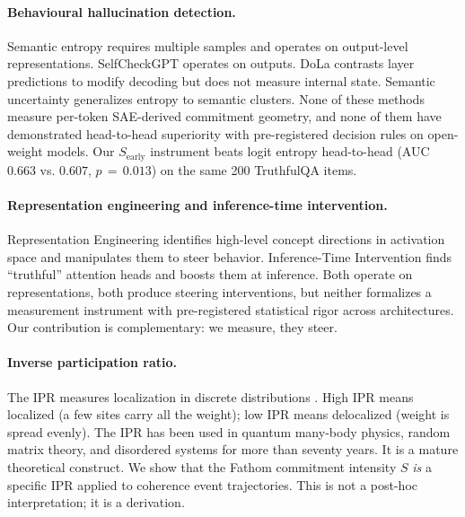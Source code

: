 \documentclass[11pt,letterpaper]{article}
\begin{document}
\paragraph{Behavioural hallucination detection.} Semantic entropy
\citep{farquhar2024semantic} requires multiple samples and operates on
output-level representations. SelfCheckGPT \citep{manakul2023selfcheckgpt}
operates on outputs. DoLa \citep{chuang2024dola} contrasts layer
predictions to modify decoding but does not measure internal state.
Semantic uncertainty \citep{kuhn2023semantic} generalizes
entropy to semantic clusters. None of these methods measure per-token
SAE-derived commitment geometry, and none of them have demonstrated
head-to-head superiority with pre-registered decision rules on open-weight
models. Our $S_{\text{early}}$ instrument beats logit entropy head-to-head
(AUC $0.663$ vs. $0.607$, $p\,=\,0.013$) on the same 200 TruthfulQA items.

\paragraph{Representation engineering and inference-time intervention.}
Representation Engineering \citep{zou2023representation} identifies
high-level concept directions in activation space and manipulates them to
steer behavior. Inference-Time Intervention \citep{li2024iti} finds
``truthful'' attention heads and boosts them at inference. Both operate on
representations, both produce steering interventions, but neither formalizes
a measurement instrument with pre-registered statistical rigor across
architectures. Our contribution is complementary: we measure, they steer.

\paragraph{Inverse participation ratio.} The IPR measures localization in
discrete distributions \citep{anderson1958absence}. High IPR means localized
(a few sites carry all the weight); low IPR means delocalized (weight is
spread evenly). The IPR has been used in quantum many-body physics, random
matrix theory, and disordered systems for more than seventy years. It is
a mature theoretical construct. We show that the Fathom commitment intensity
$S$ \emph{is} a specific IPR applied to coherence event trajectories. This
is not a post-hoc interpretation; it is a derivation.
\end{document}
